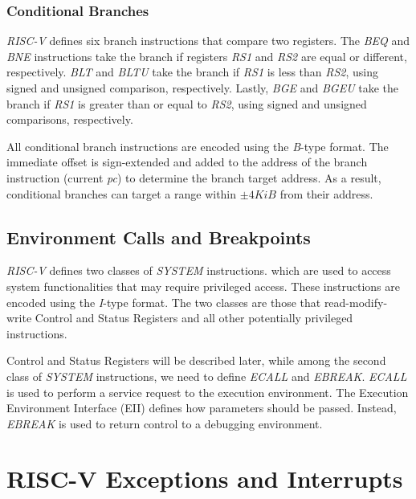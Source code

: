\subsubsection{Conditional Branches}
\label{subsubsec:riscv_conditionalb}

\textit{RISC-V} defines six branch instructions that compare two registers. The \textit{BEQ}
and \textit{BNE} instructions take the branch if registers \textit{RS1} and
\textit{RS2} are equal or different, respectively. \textit{BLT} and \textit{BLTU}
take the branch if \textit{RS1} is less than \textit{RS2}, using signed and
unsigned comparison, respectively. Lastly, \textit{BGE} and \textit{BGEU} take the
branch if \textit{RS1} is greater than or equal to \textit{RS2}, using signed
and unsigned comparisons, respectively.

All conditional branch instructions are encoded using the \textit{B}-type format.
The immediate offset is sign-extended and added to the address of the branch instruction
(current \textit{pc}) to determine the branch target address. As a result,
conditional branches can target a range within $\pm 4 \textit{KiB}$ from their
address.

\subsection{Environment Calls and Breakpoints}
\label{subsec:riscv_ecalls}

\textit{RISC-V} defines two classes of \textit{SYSTEM} instructions. which are
used to access system functionalities that may require privileged access. These instructions
are encoded using the \textit{I}-type format. The two classes are those that read-modify-write
Control and Status Registers and all other potentially privileged instructions.

Control and Status Registers will be described later, while among the second
class of \textit{SYSTEM} instructions, we need to define \textit{ECALL} and \textit{EBREAK}.
\textit{ECALL} is used to perform a service request to the execution environment.
The Execution Environment Interface (EII) defines how parameters should be passed.
Instead, \textit{EBREAK} is used to return control to a debugging environment.

\section{RISC-V Exceptions and Interrupts}
\label{sec:riscv_eti}

